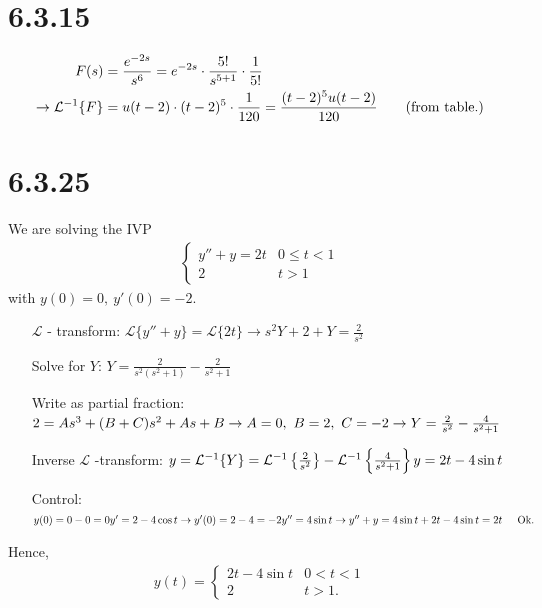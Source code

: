 \documentclass[11pt,a4paper]{article}
\newcommand{\Laplace}{\mathcal{L}}
\begin{document}
\section*{6.3.15}
\begin{align*}
	F(s) 
	&= \frac{e^{-2s}}{s^6} 
	= e^{-2s} \cdot \frac{5!}{s^{5+1}} \cdot \frac{1}{5!} \\
	\rightarrow \Laplace^{-1}\{F\}
	&= u(t-2) \cdot (t-2)^5 \cdot \frac{1}{120}
	= \frac{(t-2)^5 u(t-2)}{120}
	\hspace*{.7cm} \text{(from table.)}
\end{align*}

\newpage
\section*{6.3.25}
We are solving the IVP
\begin{align*}
	\left\{\begin{matrix}
	y'' + y = 2t & 0 \leq t < 1 \\ 
	2 & t > 1 
	\end{matrix}\right.
\end{align*}
with $y(0) = 0,\ y'(0) = -2$.
\begin{itemize}[leftmargin=4.0cm,labelsep=0.5cm]
\item[$\Laplace$ - transform:]
	$\Laplace\{y'' + y\} = \Laplace\{2t\} 
	\rightarrow s^2Y + 2 + Y = \frac{2}{s^2}$
\item[Solve for $Y$:]
	$Y = \frac{2}{s^2(s^2+1)} - \frac{2}{s^2+1}$
\item[Write as partial fraction:]
	$2 = As^3 + (B+C)s^2 + As + B \\
	\rightarrow A = 0,\ B = 2,\ C = -2 \\
	\rightarrow Y = \frac{2}{s^2} - \frac{4}{s^2+1}$
\item[Inverse $\Laplace$ -transform:]
	$y = \Laplace^{-1}\{Y\}
	= \Laplace^{-1}\left\{\frac{2}{s^2}\right\} - \Laplace^{-1}\left\{\frac{4}{s^2+1}\right\} \\
	y = 2t - 4\sin t$
\item[Control:]
	$y(0) = 0 - 0 = 0 \\
	y' = 2 - 4 \cos t \\
	\rightarrow y'(0) = 2 - 4 = -2 \\
	y'' = 4 \sin t \\
	\rightarrow y'' + y = 4 \sin t + 2t - 4 \sin t = 2t
	\hspace*{0.5cm} \text{Ok.}$
\end{itemize}
Hence,
\begin{align*}
	y(t) = 
	\left\{\begin{matrix}
	2t - 4 \sin t & 0 < t < 1 \\ 
	2 & t > 1.
	\end{matrix}\right.
\end{align*}
\end{document}

